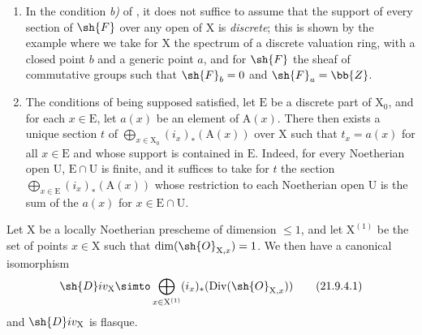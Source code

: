 \begin{remark}[21.9.3]
\label{IV.21.9.3}
\begin{enumerate}[label=(\roman*)]
  \item In the condition \emph{b)} of , it does not suffice to assume that the support of every section of $\sh{F}$ over any open of $\mathrm{X}$ is \emph{discrete};
this is shown by the example where we take for $\mathrm{X}$ the spectrum of a discrete valuation ring, with a closed point $b$ and a generic point $a$, and for $\sh{F}$ the sheaf of commutative groups such that $\sh{F}_b=0$ and $\sh{F}_a=\bb{Z}$.

  \item The conditions of  being supposed satisfied, let $\mathrm{E}$ be a discrete part of $\mathrm{X}_0$, and for each $x\in\mathrm{E}$, let $a(x)$ be an element of $\mathrm{A}(x)$.
There then exists a unique section $t$ of $\bigoplus_{x\in\mathrm{X}_0}(i_x)_*(\mathrm{A}(x))$ over $\mathrm{X}$ such that $t_x=a(x)$ for all $x\in\mathrm{E}$ and whose support is contained in $\mathrm{E}$.
Indeed, for every Noetherian open $\mathrm{U}$, $\mathrm{E}\cap\mathrm{U}$ is finite, and it suffices to take for $t$ the section $\bigoplus_{x\in\mathrm{E}}(i_x)_*(\mathrm{A}(x))$ whose restriction to each Noetherian open $\mathrm{U}$ is the sum of the $a(x)$ for $x\in\mathrm{E}\cap\mathrm{U}$.
\end{enumerate}
\end{remark}

\begin{proposition}[21.9.4]
\label{IV.21.9.4}
Let $\mathrm{X}$ be a locally Noetherian prescheme of dimension $\leq 1$, and let $\mathrm{X}^{(1)}$ be the set of points $x\in\mathrm{X}$ such that $\dim(\sh{O}_{\mathrm{X},x})=1$.
We then have a canonical isomorphism
\[
\label{IV.21.9.4.1}
  \sh{D}iv_\mathrm{X}\simto\bigoplus_{x\in\mathrm{X}^{(1)}}(i_x)_*(\operatorname{Div}(\sh{O}_{\mathrm{X},x}))
  \tag{21.9.4.1}
\]
and $\sh{D}iv_\mathrm{X}$ is flasque.
\end{proposition}

